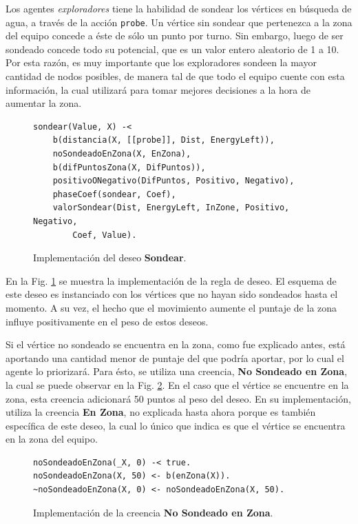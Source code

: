 \documentclass[oneside]{book}
\theoremstyle{definition}
\theoremstyle{example}
\begin{document}
Los agentes \textit{exploradores} tiene la habilidad de sondear los vértices en 
búsqueda de agua, a través de la acción \texttt{probe}. Un vértice sin sondear 
que pertenezca a la zona del equipo concede a éste de sólo un punto por turno. 
Sin embargo, luego de ser sondeado concede todo su potencial, que es un valor 
entero aleatorio de 1 a 10. Por esta razón, es muy importante que los 
exploradores sondeen la mayor cantidad de nodos posibles, de manera tal de que 
todo el equipo cuente con esta información, la cual utilizará para tomar 
mejores decisiones a la hora de aumentar la zona.

\begin{figure}
\begin{verbatim}
sondear(Value, X) -< 
    b(distancia(X, [[probe]], Dist, EnergyLeft)),
    noSondeadoEnZona(X, EnZona),
    b(difPuntosZona(X, DifPuntos)),
    positivoONegativo(DifPuntos, Positivo, Negativo),
    phaseCoef(sondear, Coef),
    valorSondear(Dist, EnergyLeft, InZone, Positivo, Negativo, 
    	Coef, Value).
\end{verbatim}
\caption{Implementación del deseo \textbf{Sondear}.}
\label{fig:deseoSondear}
\end{figure}

En la Fig. \ref{fig:deseoSondear} se muestra la implementación de la regla de 
deseo. El esquema de este deseo es instanciado con los vértices que no hayan 
sido sondeados hasta el momento. A su vez, el hecho que el movimiento aumente
el puntaje de la zona influye positivamente en el peso de estos deseos.

Si el vértice no sondeado se encuentra en la zona, como fue explicado antes,
está aportando una cantidad menor de puntaje del que podría aportar, por lo 
cual el agente lo priorizará. Para ésto, se utiliza una creencia,
\textbf{No Sondeado en Zona}, la cual se puede observar en la Fig. 
\ref{fig:creenciaNoSondeado}. En el caso que el vértice se encuentre en la 
zona, esta creencia adicionará 50 puntos al peso del deseo. En su 
implementación, utiliza la creencia \textbf{En Zona}, no explicada hasta
ahora porque es también específica de este deseo, la cual lo único que 
indica es que el vértice se encuentra en la zona del equipo.

\begin{figure}
\begin{verbatim}
noSondeadoEnZona(_X, 0) -< true.
noSondeadoEnZona(X, 50) <- b(enZona(X)).
~noSondeadoEnZona(X, 0) <- noSondeadoEnZona(X, 50).
\end{verbatim}
\caption{Implementación de la creencia \textbf{No Sondeado 
en Zona}.}
\label{fig:creenciaNoSondeado}
\end{figure}
\end{document}
